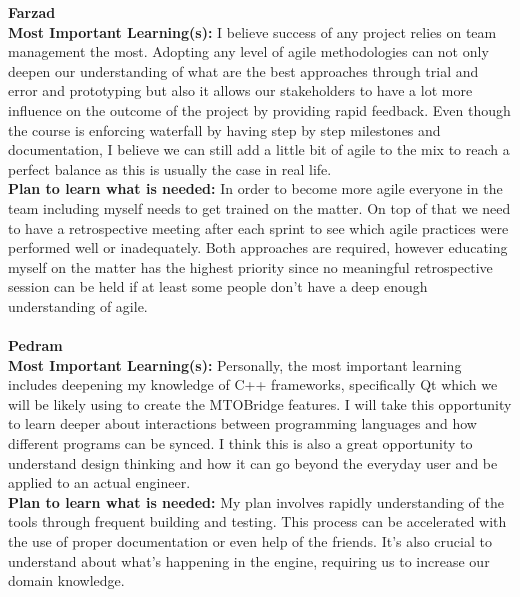 \documentclass[12pt]{article}
\begin{document}
\noindent\textbf{Farzad}\\
\textbf{Most Important Learning(s):} I believe success of any project relies on team management the most. Adopting any level of agile methodologies can not only deepen 
our understanding of what are the best approaches through trial and error and prototyping but also it allows our stakeholders to have a lot more influence on the outcome 
of the project by providing rapid feedback. Even though the course is enforcing waterfall by having step by step milestones and documentation, I believe we can still add 
a little bit of agile to the mix to reach a perfect balance as this is usually the case in real life.\\
\textbf{Plan to learn what is needed:} In order to become more agile everyone in the team including myself needs to get trained on the matter. On top of that we need to 
have a retrospective meeting after each sprint to see which agile practices were performed well or inadequately. Both approaches are required, however educating myself on 
the matter has the highest priority since no meaningful retrospective session can be held if at least some people don't have a deep enough understanding of agile.\\\\

\noindent\textbf{Pedram}\\
\textbf{Most Important Learning(s):} Personally, the most important learning includes deepening my knowledge of C++ frameworks, specifically Qt which we will be likely 
using to create the MTOBridge features. I will take this opportunity to learn deeper about interactions between programming languages and how different programs can be 
synced. I think this is also a great opportunity to understand design thinking and how it can go beyond the everyday user and be applied to an actual engineer. \\
\textbf{Plan to learn what is needed:} My plan involves rapidly understanding of the tools through frequent building and testing. This process can be accelerated with the 
use of proper documentation or even help of the friends. It’s also crucial to understand about what’s happening in the engine, requiring us to increase our domain knowledge. \\\\
\end{document}
